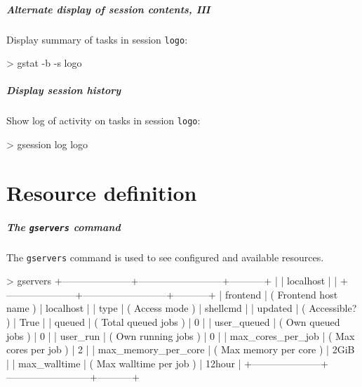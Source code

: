 \documentclass[english,serif,mathserif,usenames,dvipsnames]{beamer}
\begin{document}
\begin{frame}
  \frametitle{Alternate display of session contents, III}

  Display summary of tasks in session \texttt{logo}:
\begin{semiverbatim}
    > gstat -b -s logo
\end{semiverbatim}
\end{frame}


\begin{frame}
  \frametitle{Display session history}

  Show log of activity on tasks in session \texttt{logo}:
\begin{semiverbatim}
    > gsession log logo
\end{semiverbatim}
\end{frame}


\part{Resource definition}
\begin{frame}[fragile]
  \frametitle{The \texttt{gservers} command}

  The \texttt{gservers} command is used to see \alert<2>{configured} and
  available resources.

\+
\begin{stdout}
> gservers
+---------------------+--------------------------+-----------+
|                     | localhost                |           |
+---------------------+--------------------------+-----------+
|            frontend | ( Frontend host name )   | localhost |
|                type | ( Access mode )          | shellcmd  |
|             updated | ( Accessible? )          | True      |
|              queued | ( Total queued jobs )    | 0         |
|         user_queued | ( Own queued jobs )      | 0         |
|            user_run | ( Own running jobs )     | 0         |
|   max_cores_per_job | ( Max cores per job )    | 2         |
| max_memory_per_core | ( Max memory per core )  | 2GiB      |
|        max_walltime | ( Max walltime per job ) | 12hour    |
+---------------------+--------------------------+-----------+
\end{stdout}

\end{frame}
\end{document}
